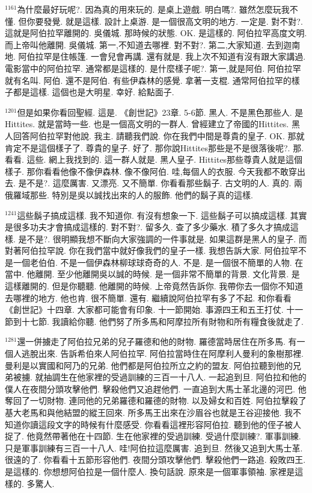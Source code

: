 \documentclass{book}
\begin{document}
$^{1161}$為什麼最好玩呢?.
因為真的用來玩的.
是桌上遊戲.
明白嗎?.
雖然怎麼玩我不懂.
但你要發覺.
就是這樣.
設計上桌游.
是一個很高文明的地方.
一定是.
對不對?.
這就是阿伯拉罕離開的.
吳儀城.
那時候的狀態.
OK.
是這樣的.
阿伯拉罕高度文明.
而上帝叫他離開.
吳儀城.
第一,不知道去哪裡.
對不對?.
第二,大家知道.
去到迦南地.
阿伯拉罕是住帳篷.
一會兒會再講.
還有就是.
我上次不知道有沒有跟大家講過.
電影當中的阿伯拉罕.
通常都是這樣的.
是什麼樣子呢?.
第一,就是阿伯.
阿伯拉罕就有名叫.
阿伯.
還不是阿伯.
有些伊森林的感覺.
拿著一支棍.
通常阿伯拉罕的樣子都是這樣.
這個也是大明星.
幸好.
給點面子.

$^{1201}$但是如果你看回聖經.
這是.
《創世記》23章.
5-6節.
黑人.
不是黑色那些人.
是Hittites.
就是當時一些.
也是一個高文明的一群人.
曾經建立了帝國的Hittites.
黑人回答阿伯拉罕對他說.
我主.
請聽我們說.
你在我們中間是尊貴的皇子.
OK.
那就肯定不是這個樣子了.
尊貴的皇子.
好了.
那你說Hittites那些是不是很落後呢?.
那.
看看.
這些.
網上我找到的.
這一群人就是.
黑人皇子.
Hittites那些尊貴人就是這個樣子.
那你看看他像不像伊森林.
像不像阿伯.
哇,每個人的衣服.
今天我都不敢穿出去.
是不是?.
這麼厲害.
又漂亮.
又不簡單.
你看看那些鬍子.
古文明的人.
真的.
兩俄羅域那些.
特別是吳以誠找出來的人的服飾.
他們的鬍子真的這樣.

$^{1241}$這些鬍子搞成這樣.
我不知道你.
有沒有想象一下.
這些鬍子可以搞成這樣.
其實是很多功夫才會搞成這樣的.
對不對?.
留多久.
查了多少藥水.
積了多久才搞成這樣.
是不是?.
很明顯我想不斷向大家強調的一件事就是.
如果這群是黑人的皇子.
而對著阿伯拉罕說.
你在我們當中就好像我們的皇子一樣.
我想告訴大家.
阿伯拉罕不是一個老伯伯.
不是一個伊森林柳球球奇奇的人.
不是.
是一個很不簡單的人物.
在當中.
他離開.
至少他離開吳以誠的時候.
是一個非常不簡單的背景.
文化背景.
是這樣離開的.
但是你聽聽.
他離開的時候.
上帝竟然告訴你.
我帶你去一個你不知道去哪裡的地方.
他也肯.
很不簡單.
還有.
繼續說阿伯拉罕有多了不起.
和你看看《創世記》十四章.
大家都可能會有印象.
十一節開始.
事源四王和五王打仗.
十一節到十七節.
我讀給你聽.
他們努了所多馬和阿摩拉所有財物和所有糧食後就走了.

$^{1281}$還一併擄走了阿伯拉兄弟的兒子羅德和他的財物.
羅德當時居住在所多馬.
有一個人逃脫出來.
告訴希伯來人阿伯拉罕.
阿伯拉當時住在阿摩利人曼利的象樹那裡.
曼利是以實國和阿乃的兄弟.
他們都是阿伯拉所立之約的盟友.
阿伯拉聽到他的兄弟被擄.
就抽調生在他家裡的受過訓練的三百一十八人.
一起追到旦.
阿伯拉和他的僕人在夜間分頭攻擊他們.
擊殺他們又追趕他們.
一直追到大馬士革北邊的河巴.
他奪回了一切財物.
連同他的兄弟羅德和羅德的財物.
以及婦女和百姓.
阿伯拉擊殺了基大老馬和與他結盟的縱王回來.
所多馬王出來在沙眉谷也就是王谷迎接他.
我不知道你讀這段文字的時候有什麼感受.
你看看這裡形容阿伯拉.
聽到他的侄子被人捉了.
他竟然帶著他在十四節.
生在他家裡的受過訓練.
受過什麼訓練?.
軍事訓練.
只是軍事訓練有三百一十八人.
哇!阿伯拉這麼厲害.
追到旦.
然後又追到大馬士革.
很遠的了.
你看看十五節形容他們.
夜間分頭攻擊他們.
擊殺他們一路追.
殺敗四王.
是這樣的.
你想想阿伯拉是一個什麼人.
換句話說.
原來是一個軍事領袖.
家裡是這樣的.
多驚人.
\end{document}
